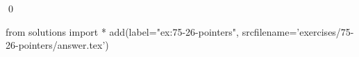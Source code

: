 
\begin{ex}
  \label{ex:75-26-pointers}
  
  \qed
\end{ex}
\begin{python0}
from solutions import *
add(label="ex:75-26-pointers",
    srcfilename='exercises/75-26-pointers/answer.tex')
\end{python0}
